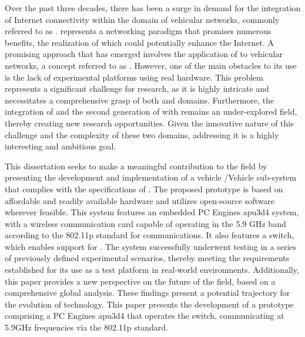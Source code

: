 
%





Over the past three decades, there has been a surge in demand for the integration of Internet connectivity within the domain of vehicular networks, commonly referred to as . 
 represents a networking paradigm that promises numerous benefits, the realization of which could potentially enhance the Internet. 
A promising approach that has emerged involves the application of  to vehicular networks, a concept referred to as . 
However, one of the main obstacles to its use is the lack of experimental platforms using real hardware.
This problem represents a significant challenge for  research, as it is highly intricate and necessitates a comprehensive grasp of both  and  domains. 
Furthermore, the integration of  and the second generation of  with  remains an under-explored field, thereby creating new research opportunities. 
Given the innovative nature of this challenge and the complexity of these two domains, addressing it is a highly interesting and ambitious goal.

This dissertation seeks to make a meaningful contribution to the field by presenting the development and implementation of a vehicle /Vehicle  sub-system that complies with the specifications of .
The proposed prototype is based on affordable and readily available hardware and utilizes open-source software wherever feasible. 
This system features an embedded PC Engines apu3d4 system, with a wireless communication card capable of operating in the 5.9 GHz band according to the  802.11p standard for  communications. It also  features a  switch, which enables support for . 
The system successfully underwent testing in a series of previously defined experimental scenarios, thereby meeting the requirements established for its use as a test platform in real-world environments. 
Additionally, this paper provides a new perspective on the future of the  field, based on a comprehensive global analysis. These findings present a potential trajectory for the evolution of  technology. This paper presents the development of a prototype comprising a PC Engines apu3d4 that operates the   switch, communicating at 5.9GHz frequencies via the 802.11p standard. 


